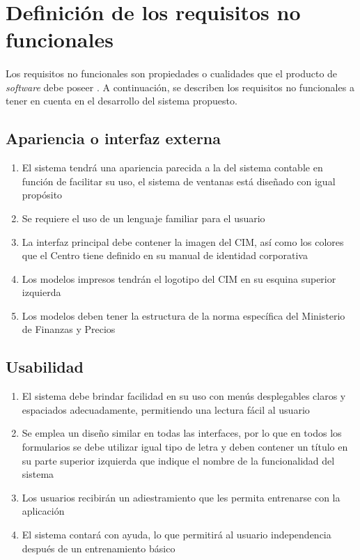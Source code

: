 \section{Definición de los requisitos no funcionales}
\paragraph{}Los requisitos no funcionales son propiedades o cualidades que el producto de \textit{software} debe poseer \cite{miranda_aplicaciones_2018}. A continuación, se describen los requisitos no funcionales a tener en cuenta en el desarrollo del sistema propuesto.

\subsection{Apariencia o interfaz externa}
\begin{enumerate}
	\item El sistema tendrá una apariencia parecida a la del sistema contable en función de facilitar su uso, el sistema de ventanas está diseñado con igual propósito
	\item Se requiere el uso de un lenguaje familiar para el usuario 
	\item La interfaz principal debe contener la imagen del CIM, así como los colores que el Centro tiene definido en su manual de identidad corporativa
	\item Los modelos impresos tendrán el logotipo del CIM en su esquina superior izquierda
	\item Los modelos deben tener la estructura de la norma específica  del Ministerio de Finanzas y Precios\cite{noauthor_resolucion_2007}
\end{enumerate}
\subsection{Usabilidad}
\begin{enumerate}
	\item El sistema debe brindar facilidad en su uso con menús desplegables claros y espaciados adecuadamente, permitiendo una lectura fácil al usuario
	\item Se emplea un diseño similar en todas las interfaces, por lo que en todos los formularios se debe utilizar igual tipo de letra y deben contener un título en su parte superior izquierda que indique el nombre de la funcionalidad del sistema
	\item Los usuarios recibirán un adiestramiento que les permita entrenarse con la aplicación
	\item El sistema contará con ayuda, lo que permitirá al usuario independencia después de un entrenamiento básico
\end{enumerate}
